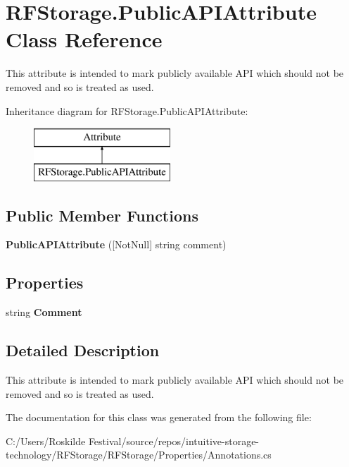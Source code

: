 \hypertarget{class_r_f_storage_1_1_public_a_p_i_attribute}{}\section{R\+F\+Storage.\+Public\+A\+P\+I\+Attribute Class Reference}
\label{class_r_f_storage_1_1_public_a_p_i_attribute}


This attribute is intended to mark publicly available A\+PI which should not be removed and so is treated as used.  


Inheritance diagram for R\+F\+Storage.\+Public\+A\+P\+I\+Attribute\+:\begin{figure}[H]
\begin{center}
\leavevmode
\includegraphics[height=2.000000cm]{class_r_f_storage_1_1_public_a_p_i_attribute}
\end{center}
\end{figure}
\subsection*{Public Member Functions}
\begin{DoxyCompactItemize}
\item 
\mbox{\label{class_r_f_storage_1_1_public_a_p_i_attribute_a1ed80a17937c5cb90b1aa2d6598bf0ec}} 
{\bfseries Public\+A\+P\+I\+Attribute} (\mbox{[}Not\+Null\mbox{]} string comment)
\end{DoxyCompactItemize}
\subsection*{Properties}
\begin{DoxyCompactItemize}
\item 
\mbox{\label{class_r_f_storage_1_1_public_a_p_i_attribute_a5f2fad27fedc9133864d138f3734ee97}} 
string {\bfseries Comment}
\end{DoxyCompactItemize}


\subsection{Detailed Description}
This attribute is intended to mark publicly available A\+PI which should not be removed and so is treated as used. 



The documentation for this class was generated from the following file\+:\begin{DoxyCompactItemize}
\item 
C\+:/\+Users/\+Roskilde Festival/source/repos/intuitive-\/storage-\/technology/\+R\+F\+Storage/\+R\+F\+Storage/\+Properties/Annotations.\+cs\end{DoxyCompactItemize}
